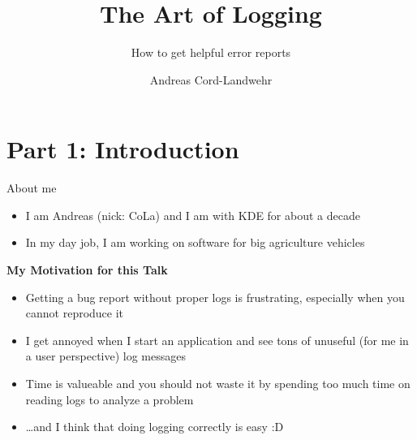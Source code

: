 \documentclass[t,compress,aspectratio=169]{beamer}
\title{The Art of Logging}
\subtitle{How to get helpful error reports}
\author{Andreas Cord-Landwehr}
\begin{document}
\begin{withoutheadline}
\begin{frame}
\titlepage
\end{frame}
\end{withoutheadline}


\section{Part 1: Introduction}

\begin{frame}
    {About me}

    \begin{itemize}
        \item I am Andreas (nick: CoLa) and I am with KDE for about a decade
        \item In my day job, I am working on software for big agriculture vehicles
    \end{itemize}
    \bigskip
    \pause

    \textbf{My Motivation for this Talk}
    \begin{itemize}
        \item Getting a bug report without proper logs is frustrating, especially when you cannot reproduce it
        \item I get annoyed when I start an application and see tons of unuseful (for me in a user perspective) log messages
        \item Time is valueable and you should not waste it by spending too much time on reading logs to analyze a problem
        \item \dots and I think that doing logging correctly is easy :D
    \end{itemize}
\end{frame}
\end{document}
